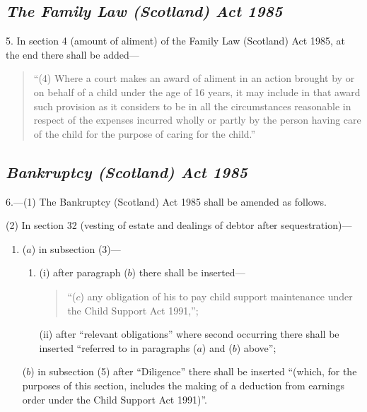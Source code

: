 \documentclass[12pt,a4paper]{article}
\begin{document}

\subsection*{\itshape The Family Law (Scotland) Act 1985}

5. In section 4 (amount of aliment) of the Family Law (Scotland) Act 1985, at the end there shall be added—
\begin{quotation}
“(4) Where a court makes an award of aliment in an action brought by or on behalf of a child under the age of 16 years, it may include in that award such provision as it considers to be in all the circumstances reasonable in respect of the expenses incurred wholly or partly by the person having care of the child for the purpose of caring for the child.”
\end{quotation}

\subsection*{\itshape Bankruptcy (Scotland) Act 1985}

6.---(1) The Bankruptcy (Scotland) Act 1985 shall be amended as follows.

(2) In section 32 (vesting of estate and dealings of debtor after sequestration)—
\begin{enumerate}\item[]
($a$) in subsection (3)—
\begin{enumerate}\item[]
(i) after paragraph ($b$)  there shall be inserted—
\begin{quotation}
“($c$) any obligation of his to pay child support maintenance under the Child Support Act 1991,”;
\end{quotation}

(ii) after “relevant obligations” where second occurring there shall be inserted “referred to in paragraphs ($a$)  and ($b$)  above”;
\end{enumerate}

($b$) in subsection (5)  after “Diligence” there shall be inserted “(which, for the purposes of this section, includes the making of a deduction from earnings order under the Child Support Act 1991)”.
\end{enumerate}
\end{document}
